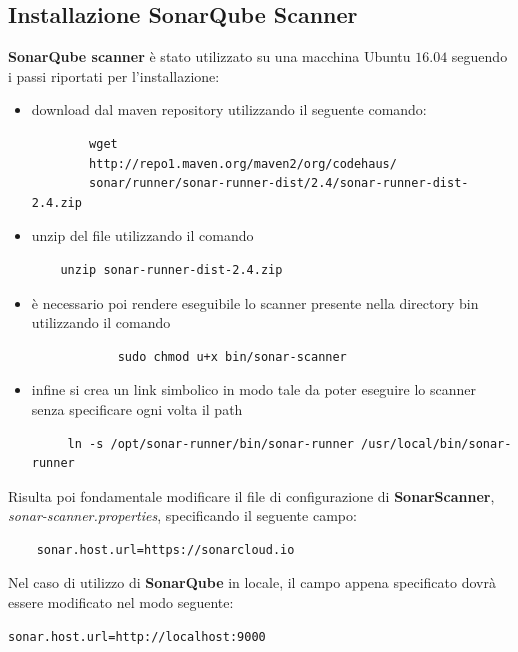 \subsection{Installazione SonarQube Scanner}
\textbf{SonarQube scanner} è stato utilizzato su una macchina Ubuntu $16.04$ seguendo i passi riportati per l'installazione:
\begin{itemize}
	\item download dal maven repository utilizzando il seguente comando: 
	\begin{verbatim}
		wget 
		http://repo1.maven.org/maven2/org/codehaus/
		sonar/runner/sonar-runner-dist/2.4/sonar-runner-dist-2.4.zip
	\end{verbatim}	
	\item unzip del file utilizzando il comando
	\begin{verbatim}
	unzip sonar-runner-dist-2.4.zip
	\end{verbatim}
	\item è necessario poi rendere eseguibile lo scanner presente nella directory bin utilizzando il comando 
	\begin{verbatim}
			sudo chmod u+x bin/sonar-scanner
	\end{verbatim}
	\item infine si crea un link simbolico in modo tale da poter eseguire lo scanner senza specificare ogni volta il path
	\begin{verbatim}
	 ln -s /opt/sonar-runner/bin/sonar-runner /usr/local/bin/sonar-runner
	\end{verbatim}
\end{itemize}
Risulta poi fondamentale modificare il file di configurazione di \textbf{SonarScanner}, \textit{sonar-scanner.properties}, specificando il seguente campo:
\begin{verbatim}
	sonar.host.url=https://sonarcloud.io
\end{verbatim}
Nel caso di utilizzo di \textbf{SonarQube} in locale, il campo appena specificato dovrà essere modificato nel modo seguente:
\begin{verbatim}
sonar.host.url=http://localhost:9000
\end{verbatim}

